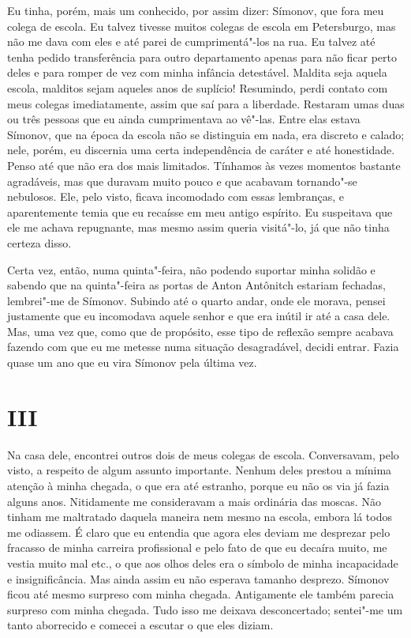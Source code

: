 Eu tinha, porém, mais um conhecido, por assim dizer: Símonov, que fora
meu colega de escola. Eu talvez tivesse muitos colegas de escola em
Petersburgo, mas não me dava com eles e até parei de cumprimentá"-los na
rua. Eu talvez até tenha pedido transferência para outro departamento
apenas para não ficar perto deles e para romper de vez com minha
infância detestável. Maldita seja aquela escola, malditos sejam aqueles
anos de suplício! Resumindo, perdi contato com meus colegas
imediatamente, assim que saí para a liberdade. Restaram umas duas ou
três pessoas que eu ainda cumprimentava ao vê"-las. Entre elas estava
Símonov, que na época da escola não se distinguia em nada, era discreto
e calado; nele, porém, eu discernia uma certa independência de caráter
e até honestidade. Penso até que não era dos mais limitados. Tínhamos
às vezes momentos bastante agradáveis, mas que duravam muito pouco e
que acabavam tornando"-se nebulosos. Ele, pelo visto, ficava incomodado
com essas lembranças, e aparentemente temia que eu recaísse em meu
antigo espírito. Eu suspeitava que ele me achava repugnante, mas mesmo
assim queria visitá"-lo, já que não tinha certeza disso.

Certa vez, então, numa quinta"-feira, não podendo suportar minha solidão
e sabendo que na quinta"-feira as portas de Anton Antônitch estariam
fechadas, lembrei"-me de Símonov. Subindo até o quarto andar, onde ele
morava, pensei justamente que eu incomodava aquele senhor e que era
inútil ir até a casa dele. Mas, uma vez que, como que de propósito,
esse tipo de reflexão sempre acabava fazendo com que eu me metesse numa
situação desagradável, decidi entrar. Fazia quase um ano que eu vira
Símonov pela última vez.


\section{III}

Na casa dele, encontrei outros dois de meus colegas de escola.
Conversavam, pelo visto, a respeito de algum assunto importante. Nenhum
deles prestou a mínima atenção à minha chegada, o que era até estranho,
porque eu não os via já fazia alguns anos. Nitidamente me consideravam
a mais ordinária das moscas. Não tinham me maltratado daquela maneira
nem mesmo na escola, embora lá todos me odiassem. É claro que eu
entendia que agora eles deviam me desprezar pelo fracasso de minha
carreira profissional e pelo fato de que eu decaíra muito, me vestia
muito mal etc., o que aos olhos deles era o símbolo de minha
incapacidade e insignificância. Mas ainda assim eu não esperava tamanho
desprezo. Símonov ficou até mesmo surpreso com minha chegada.
Antigamente ele também parecia surpreso com minha chegada. Tudo isso me
deixava desconcertado; sentei"-me um tanto aborrecido e comecei a
escutar o que eles diziam.

